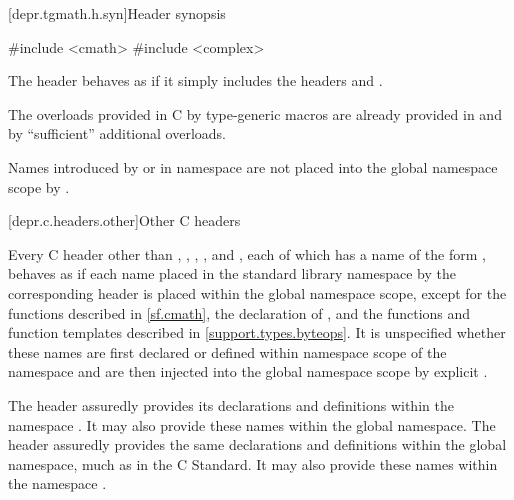 
[depr.tgmath.h.syn]{Header  synopsis}

%
\begin{codeblock}
#include <cmath>
#include <complex>
\end{codeblock}

\pnum
The header 
behaves as if it simply includes the headers
 and
.

\pnum
\begin{note}
The overloads provided in C by type-generic macros
are already provided in  and 
by ``sufficient'' additional overloads.
\end{note}

\pnum
\begin{note}
Names introduced by  or 
in namespace 
are not placed into the global namespace scope by .
\end{note}

[depr.c.headers.other]{Other C headers}

\pnum
Every C header
other than
,
,
,\newline
{}, and
,
each of
which has a name of the form
%
,
behaves as if each name placed in the standard library namespace by
the corresponding
header is placed within
the global namespace scope,
except for the functions described in \ref{sf.cmath},
the declaration of , and
the functions and function templates described in \ref{support.types.byteops}.
It is unspecified whether these names are first declared or defined within
namespace scope of the namespace
 and are then injected into the global namespace scope by
explicit .

\pnum
\begin{example}
The header  assuredly
provides its declarations and definitions within the namespace
. It may also provide these names within the
global namespace.
The header 
assuredly provides the same declarations and definitions within
the global namespace,
much as in the C Standard. It may also provide these names within
the namespace .
\end{example}

